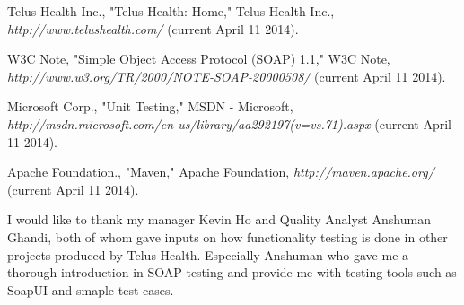 \documentclass[12pt]{article}
\begin{document}
\newpage



\begin{thebibliography}{1}

   Telus Health Inc., "Telus Health: Home," Telus Health Inc., {\em http://www.telushealth.com/} (current April 11 2014).

   W3C Note, "Simple Object Access Protocol (SOAP) 1.1," W3C Note, {\em http://www.w3.org/TR/2000/NOTE-SOAP-20000508/} (current April 11 2014).

 Microsoft Corp., "Unit Testing," MSDN - Microsoft, {\em http://msdn.microsoft.com/en-us/library/aa292197(v=vs.71).aspx} (current April 11 2014).

 Apache Foundation., "Maven," Apache Foundation, {\em http://maven.apache.org/} (current April 11 2014).

\end{thebibliography}
\newpage


I would like to thank my manager Kevin Ho and Quality Analyst Anshuman Ghandi, both of whom gave inputs on how functionality testing is done in other projects produced by Telus Health. Especially Anshuman who gave me a thorough introduction in SOAP testing and provide me with testing tools such as SoapUI and smaple test cases.\\
\\
\newpage

\end{document}
